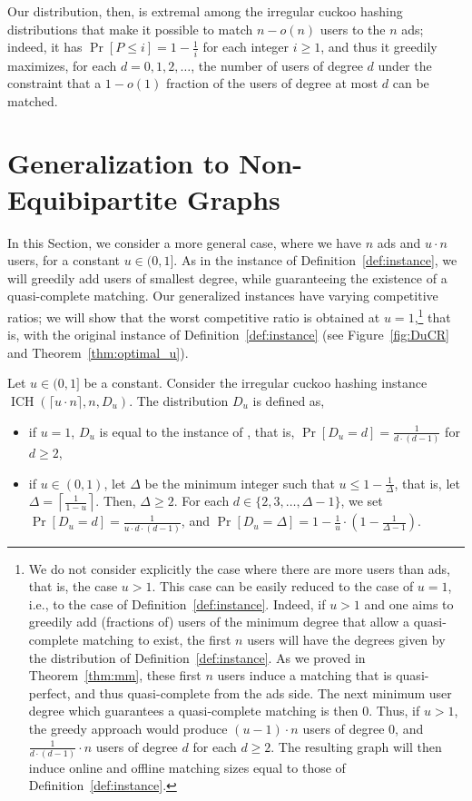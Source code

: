 \documentclass[11pt]{article}
\DeclareMathOperator*{\irregularcuckoohashing}{ICH}
\begin{document}
Our distribution, then, is extremal among the irregular cuckoo hashing distributions that make it possible to match $n-o(n)$ users to the $n$ ads; indeed, it has $\Pr[P\le i] = 1 - \frac1i$ for each integer $i \ge 1$, and thus it greedily maximizes, for each $d = 0, 1, 2, \ldots$, the number of users of degree $d$ under the constraint that a $1-o(1)$ fraction of the users of degree at most $d$ can be matched. 

\section{Generalization to Non-Equibipartite Graphs}\label{sec:uneven}
In this Section, we consider a more general case, where we have $n$ ads and $u \cdot n$ users, for a constant $u \in (0,1]$. As in the instance of Definition~\ref{def:instance}, we will greedily add users of smallest degree, while guaranteeing the existence of a quasi-complete matching. Our generalized instances have varying competitive ratios; we will show that the worst competitive ratio is obtained at $u = 1$,\footnote{We do not consider explicitly the case where there are more users than ads, that is, the case $u > 1$. This case can be easily reduced to the case of $u = 1$, i.e., to the case of Definition~\ref{def:instance}. Indeed, if $u > 1$ and one aims to greedily add (fractions of) users of the minimum degree that allow a quasi-complete matching to exist, the first $n$ users will have the degrees given by the distribution of Definition~\ref{def:instance}. As we proved in Theorem~\ref{thm:mm}, these first $n$ users induce a matching that is quasi-perfect, and thus quasi-complete from the ads side. The next minimum user degree which guarantees a quasi-complete matching is then $0$. Thus, if $u > 1$, the greedy approach would produce $(u-1)\cdot n$ users of degree $0$, and   $\frac1{d\cdot(d-1)} \cdot n$ users of degree $d$ for each $d \ge 2$. The resulting graph will then induce online and  offline matching sizes  equal to those of Definition~\ref{def:instance}.} that is, with the original instance of Definition~\ref{def:instance} (see Figure~\ref{fig:DuCR} and Theorem~\ref{thm:optimal_u}).
\begin{definition}\label{def:generalized-u-instance}
Let $u\in(0,1]$ be a constant. Consider the irregular cuckoo hashing instance $\irregularcuckoohashing(\lceil u \cdot n \rceil, n, D_u)$. The distribution $D_u$ is defined as,
\begin{itemize}
\item if $u=1$, $D_u$ is equal to the instance of , that is, $\Pr[D_u=d] = \frac{1}{d \cdot (d-1)}$ for $d\geq 2$,
\item if $u\in(0,1)$, let $\Delta$ be the minimum integer such that $u \le 1 - \frac1{\Delta}$, that is, let $\Delta = \left\lceil\frac1{1-u}\right\rceil$. Then, $\Delta \ge 2$. For each $d \in \{2,3,\ldots,\Delta-1\}$, we set $\Pr[D_u=d] = \frac{1}{u\cdot d \cdot (d-1)}$, and $\Pr[D_u=\Delta] = 1 - \frac{1}{u} \cdot \left(1-  \frac{1}{\Delta-1}\right)$.
\end{itemize}
\end{definition}
\end{document}
